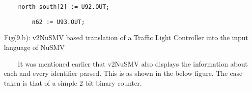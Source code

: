 \documentclass[a4paper]{article}
\begin{document}
\bigskip


\bigskip


\bigskip


\bigskip


\bigskip


\bigskip


\bigskip


\bigskip


\bigskip


\bigskip


\bigskip


\bigskip



\begin{center}
\begin{minipage}{6.07292in}
{\color[rgb]{0.0,0.0,0.039215688}
\texttt{\ \ \ \ north\_south[2] := U92.OUT;}}

{\color[rgb]{0.0,0.0,0.039215688}
\texttt{\ \ \ \ \ \ \ \ n62 := U93.OUT;}}


\bigskip
\end{minipage}
\end{center}

\bigskip

{\centering\rmfamily\color[rgb]{0.0,0.0,0.039215688}
Fig(9.b): v2NuSMV based translation of a Traffic Light Controller into
the input language of NuSMV
\par}


\bigskip

{\rmfamily\color[rgb]{0.0,0.0,0.039215688}
\ \ \ \ It was mentioned earlier that v2NuSMV also displays the
information about each and every identifier parsed. This is as shown in
the below figure. The case taken is that of a simple 2 bit binary
counter.\ }


\bigskip
\end{document}
